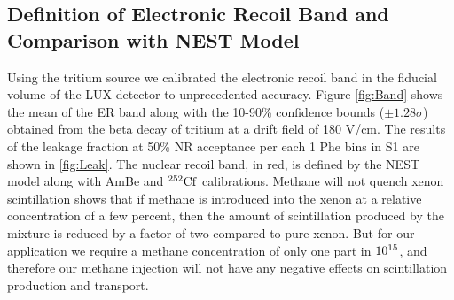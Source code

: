 \subsection{Definition of Electronic Recoil Band and Comparison with NEST Model}

Using the tritium source we calibrated the electronic recoil band in the fiducial volume of the LUX detector to unprecedented accuracy. Figure \ref{fig:Band} shows the mean of the ER band along with the 10-90\% confidence bounds ($\pm 1.28\sigma$) obtained from the beta decay of tritium at a drift field of 180 V/cm. The results of the leakage fraction at 50\% NR acceptance per each 1 Phe bins in S1 are shown in \ref{fig:Leak}. The nuclear recoil band, in red, is defined by the NEST model along with AmBe and $\rm^{252}Cf$  calibrations. Methane will not quench xenon scintillation \cite{Kirill_Methane} shows that if methane is introduced into the xenon at a relative concentration of a few percent, then the amount of scintillation produced by the mixture is reduced by a factor of two compared to pure xenon. But for our application we require a methane concentration of only one part in $\rm10^{15}$, and therefore our methane injection will not have any negative effects on scintillation production and transport.

